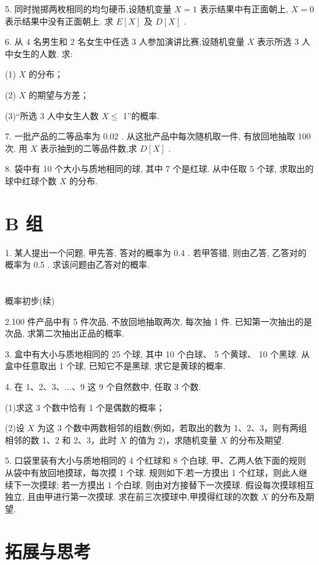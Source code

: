 \documentclass[10pt]{article}
\begin{document}
5. 同时抛掷两枚相同的均匀硬币,设随机变量 \(X = 1\) 表示结果中有正面朝上, \(X = 0\) 表示结果中没有正面朝上. 求 \(E\left\lbrack  X\right\rbrack\) 及 \(D\left\lbrack  X\right\rbrack\) .

6. 从 4 名男生和 2 名女生中任选 3 人参加演讲比赛,设随机变量 \(X\) 表示所选 3 人中女生的人数. 求:

(1) \(X\) 的分布；

(2) \(X\) 的期望与方差；

(3)“所选 3 人中女生人数 \(X \leq\) 1”的概率.

7. 一批产品的二等品率为 0.02 . 从这批产品中每次随机取一件, 有放回地抽取 100 次. 用 \(X\) 表示抽到的二等品件数,求 \(D\left\lbrack  X\right\rbrack\) .

8. 袋中有 10 个大小与质地相同的球, 其中 7 个是红球. 从中任取 5 个球, 求取出的球中红球个数 \(X\) 的分布.

\section*{B 组}

1. 某人提出一个问题, 甲先答, 答对的概率为 0.4 . 若甲答错, 则由乙答, 乙答对的概率为 0.5 . 求该问题由乙答对的概率.

\section*{}

概率初步(续)

2.100 件产品中有 5 件次品, 不放回地抽取两次, 每次抽 1 件. 已知第一次抽出的是次品, 求第二次抽出正品的概率.

3. 盒中有大小与质地相同的 25 个球, 其中 10 个白球、 5 个黄球、 10 个黑球. 从盒中任意取出 1 个球, 已知它不是黑球, 求它是黄球的概率.

4. 在 1、2、3、...、9 这 9 个自然数中, 任取 3 个数.

(1)求这 3 个数中恰有 1 个是偶数的概率；

(2)设 \(X\) 为这 3 个数中两数相邻的组数(例如，若取出的数为 1、2、3，则有两组相邻的数 1、2 和 2、3，此时 \(X\) 的值为 2)，求随机变量 \(X\) 的分布及期望.

5. 口袋里装有大小与质地相同的 4 个红球和 8 个白球, 甲、乙两人依下面的规则从袋中有放回地摸球，每次摸 1 个球. 规则如下:若一方摸出 1 个红球，则此人继续下一次摸球; 若一方摸出 1 个白球, 则由对方接替下一次摸球. 假设每次摸球相互独立, 且由甲进行第一次摸球. 求在前三次摸球中,甲摸得红球的次数 \(X\) 的分布及期望.

\section*{拓展与思考}
\end{document}
